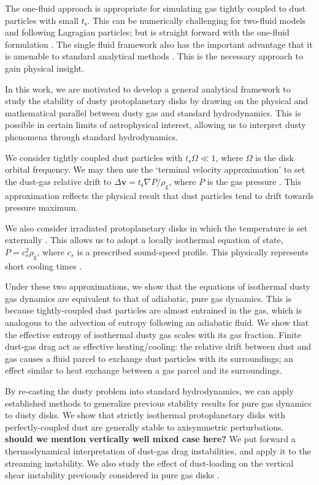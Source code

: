 \documentclass[iop, numberedappendix]{emulateapj}
\newcommand{\rhog}{\rho_\mathrm{g}}
\newcommand{\tstop}{t_\mathrm{s}}
\begin{document}
The one-fluid approach is appropriate for 
simulating gas tightly coupled to dust particles with small $\tstop$.  
This can be numerically challenging for two-fluid models and 
following Lagragian particles; but is straight forward with the 
one-fluid formulation \citep{price15}.  The single fluid framework 
also has the important advantage that it is 
amenable to standard analytical methods \citep{youdin05a,jacquet11}.  
This is the necessary approach to gain physical insight.  


In this work, we are motivated to develop a general analytical
framework to study the stability of dusty protoplanetary 
disks by drawing on the physical and mathematical parallel between
dusty gas and standard hydrodynamics. This is possible in certain limits of astrophysical
interest, allowing us to interpret dusty phenomena through standard
hydrodynamics.   

We consider tightly coupled dust particles with $\tstop\Omega\ll
1$, where $\Omega$ is the disk orbital frequency. We may then use the
`terminal velocity approximation' to set the dust-gas relative drift
to $\Delta \bm{v} = \tstop\nabla
P/\rhog$, where $P$ is the gas pressure \citep{youdin05a, 
  jacquet11,laibe14}. This approximation reflects the physical result
that dust particles tend to drift towards pressure maximum. 
 
 We also consider irradiated protoplanetary disks 
 in which the temperature is set externally
\citep{chiang97,stam08}. This allows us to adopt a locally isothermal
equation of state, $P = c_s^2\rhog$, where $c_s$ is a prescribed
sound-speed profile. This physically represents short cooling times
\citep{lin15}.   

Under these two approximations, we show that the equations of 
isothermal dusty gas dynamics are equivalent to that of adiabatic, pure gas
dynamics. This is because tightly-coupled dust particles are almost
entrained in the gas, which is analogous to the advection
of entropy following an adiabatic fluid. We show that the   
effective entropy of isothermal dusty gas scales with its gas
fraction. Finite dust-gas drag act as effective heating/cooling: the relative
drift between dust and gas causes a fluid parcel to exchange dust
particles with its surroundings; an effect similar to heat exchange
between a gas parcel and its surroundings.   


By re-casting the dusty problem into standard  
hydrodynamics, we can apply established methods to generalize previous stability 
results for pure gas dynamics to dusty disks.  
We show that strictly isothermal protoplanetary disks with
perfectly-coupled dust are generally 
stable to axisymmetric perturbations.%
{\bf should we mention vertically well mixed case here?} 
We put forward a thermodynamical interpretation of 
dust-gas drag instabilities, and apply it to the streaming instability.   
We also study the effect of dust-loading on the vertical shear
instability previously considered in pure gas disks
\citep[VSI,][]{nelson13,lin15,barker15}.  
\end{document}
